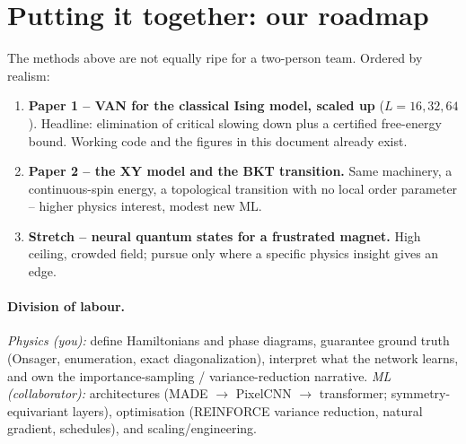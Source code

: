 \documentclass[11pt]{article}
\begin{document}
\section{Putting it together: our roadmap}
The methods above are not equally ripe for a two-person team. Ordered by realism:
\begin{enumerate}
\item \textbf{Paper 1 -- VAN for the classical Ising model, scaled up} ($L=16,32,64$).
Headline: elimination of critical slowing down plus a certified free-energy bound.
Working code and the figures in this document already exist.
\item \textbf{Paper 2 -- the XY model and the BKT transition.} Same machinery, a
continuous-spin energy, a topological transition with no local order parameter -- higher
physics interest, modest new ML.
\item \textbf{Stretch -- neural quantum states for a frustrated magnet.} High ceiling,
crowded field; pursue only where a specific physics insight gives an edge.
\end{enumerate}

\paragraph{Division of labour.} \emph{Physics (you):} define Hamiltonians and phase
diagrams, guarantee ground truth (Onsager, enumeration, exact diagonalization), interpret
what the network learns, and own the importance-sampling / variance-reduction narrative.
\emph{ML (collaborator):} architectures (MADE $\to$ PixelCNN $\to$ transformer;
symmetry-equivariant layers), optimisation (REINFORCE variance reduction, natural gradient,
schedules), and scaling/engineering.

\end{document}
